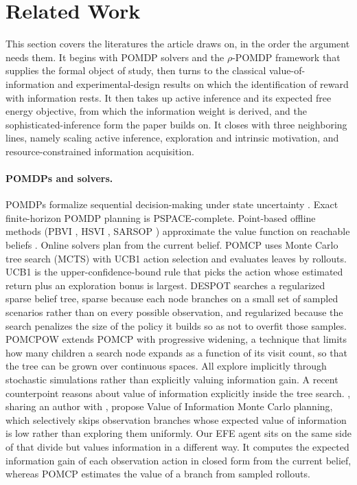 \section{Related Work}

This section covers the literatures the article draws on, in the order the argument needs them. It begins with POMDP solvers and the $\rho$-POMDP framework that supplies the formal object of study, then turns to the classical value-of-information and experimental-design results on which the identification of reward with information rests. It then takes up active inference and its expected free energy objective, from which the information weight is derived, and the sophisticated-inference form the paper builds on. It closes with three neighboring lines, namely scaling active inference, exploration and intrinsic motivation, and resource-constrained information acquisition.

\paragraph{POMDPs and solvers.}
POMDPs formalize sequential decision-making under state uncertainty \citep{smallwood1973, kaelbling1998}. Exact finite-horizon POMDP planning is PSPACE-complete. Point-based offline methods (PBVI \citep{pineau2003}, HSVI \citep{smith2004}, SARSOP \citep{kurniawati2008}) approximate the value function on reachable beliefs \citep{shani2013}. Online solvers plan from the current belief. POMCP \citep{silver2010} uses Monte Carlo tree search (MCTS) with UCB1 action selection and evaluates leaves by rollouts. UCB1 is the upper-confidence-bound rule that picks the action whose estimated return plus an exploration bonus is largest. DESPOT \citep{ye2017} searches a regularized sparse belief tree, sparse because each node branches on a small set of sampled scenarios rather than on every possible observation, and regularized because the search penalizes the size of the policy it builds so as not to overfit those samples. POMCPOW \citep{sunberg2018} extends POMCP with progressive widening, a technique that limits how many children a search node expands as a function of its visit count, so that the tree can be grown over continuous spaces. All explore implicitly through stochastic simulations rather than explicitly valuing information gain. A recent counterpoint reasons about value of information explicitly inside the tree search. \citet{laouar2026voi}, sharing an author with \citet{sunberg2018}, propose Value of Information Monte Carlo planning, which selectively skips observation branches whose expected value of information is low rather than exploring them uniformly. Our EFE agent sits on the same side of that divide but values information in a different way. It computes the expected information gain of each observation action in closed form from the current belief, whereas POMCP estimates the value of a branch from sampled rollouts.

